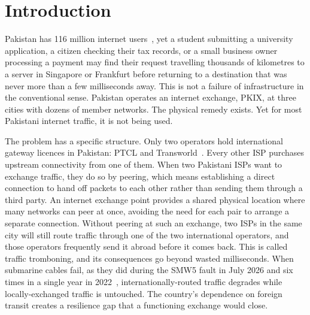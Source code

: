 \documentclass[sigconf,anonymous,10pt]{acmart}
\begin{document}

\maketitle

\section{Introduction}
Pakistan has 116 million internet users~\cite{datareportal2025pk}, yet a student submitting a university application, a citizen checking their tax records, or a small business owner processing a payment may find their request travelling thousands of kilometres to a server in Singapore or Frankfurt before returning to a destination that was never more than a few milliseconds away. This is not a failure of infrastructure in the conventional sense. Pakistan operates an internet exchange, PKIX, at three cities with dozens of member networks. The physical remedy exists. Yet for most Pakistani internet traffic, it is not being used.

The problem has a specific structure. Only two operators hold international gateway licences in Pakistan: PTCL and Transworld~\cite{pacra2023twa}. Every other ISP purchases upstream connectivity from one of them. When two Pakistani ISPs want to exchange traffic, they do so by peering, which means establishing a direct connection to hand off packets to each other rather than sending them through a third party. An internet exchange point provides a shared physical location where many networks can peer at once, avoiding the need for each pair to arrange a separate connection. Without peering at such an exchange, two ISPs in the same city will still route traffic through one of the two international operators, and those operators frequently send it abroad before it comes back. This is called traffic tromboning, and its consequences go beyond wasted milliseconds. When submarine cables fail, as they did during the SMW5 fault in July 2026 and six times in a single year in 2022~\cite{opalinski2024quest}, internationally-routed traffic degrades while locally-exchanged traffic is untouched. The country's dependence on foreign transit creates a resilience gap that a functioning exchange would close.
\end{document}
